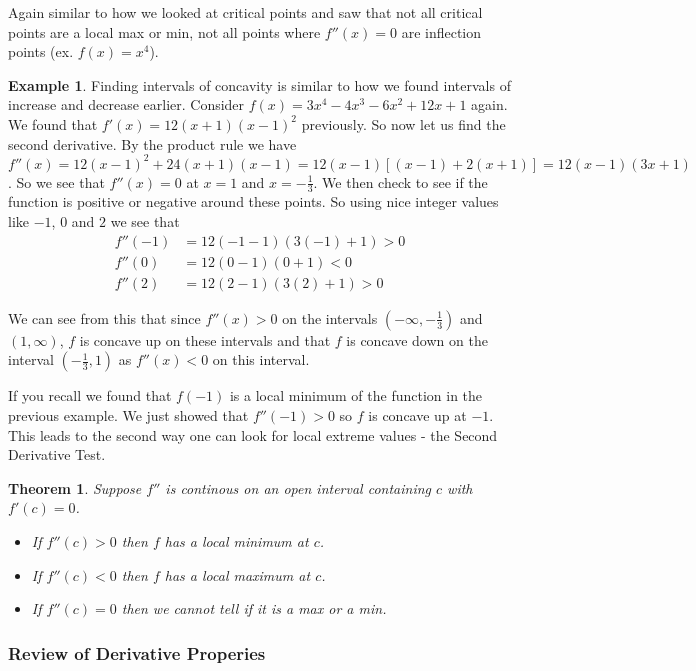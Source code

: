 \documentclass[12pt,reqno]{article}
\newtheorem{Theorem}{Theorem}
\theoremstyle{definition}
\newtheorem*{Example}{Example}
\begin{document}
Again similar to how we looked at critical points and saw that not all critical points are a local max or min, not all points where $f''(x) = 0$ are inflection points (ex. $f(x) = x^4$). 

\begin{Example}
Finding intervals of concavity is similar to how we found intervals of increase and decrease earlier. Consider $f(x) = 3x^4 - 4x^3 - 6x^2 + 12 x + 1$ again. We found that $f'(x) = 12(x + 1)(x - 1)^2$ previously. So now let us find the second derivative. By the product rule we have $f''(x) = 12 (x - 1)^2 + 24(x + 1)(x - 1) = 12(x - 1)[(x - 1) + 2(x + 1)] = 12(x - 1)(3x + 1)$. So we see that $f''(x) = 0$ at $x = 1$ and $x = -\frac{1}{3}$. We then check to see if the function is positive or negative around these points. So using nice integer values like $-1$, $0$ and $2$ we see that 
	\begin{align*}
		f''(-1) &= 12(- 1 - 1)(3(-1) + 1) > 0 \\
		f''(0) &= 12 (0 - 1)(0 + 1) < 0 \\
		f''(2) &= 12 (2 - 1) (3(2) + 1) > 0
	\end{align*}
	
	We can see from this that since $f''(x) > 0$ on the intervals $(-\infty, -\frac{1}{3})$ and $(1, \infty)$, $f$ is concave up on these intervals and that $f$ is concave down on the interval $(-\frac{1}{3}, 1)$ as $f''(x) < 0$ on this interval. 
\end{Example}

If you recall we found that $f(-1)$ is a local minimum of the function in the previous example. We just showed that $f''(-1) > 0$ so $f$ is concave up at $-1$. This leads to the second way one can look for local extreme values - the Second Derivative Test. 
\begin{Theorem} 
	Suppose $f''$ is continous on an open interval containing $c$ with $f'(c) = 0$. 
	\begin{itemize}
		\item If $f''(c) > 0$ then $f$ has a local minimum at $c$. 
		\item If $f''(c) < 0$ then $f$ has a local maximum at $c$. 
		\item If $f''(c) = 0$ then we cannot tell if it is a max or a min. 
	\end{itemize}
\end{Theorem}

\subsubsection{Review of Derivative Properies}
\end{document}
